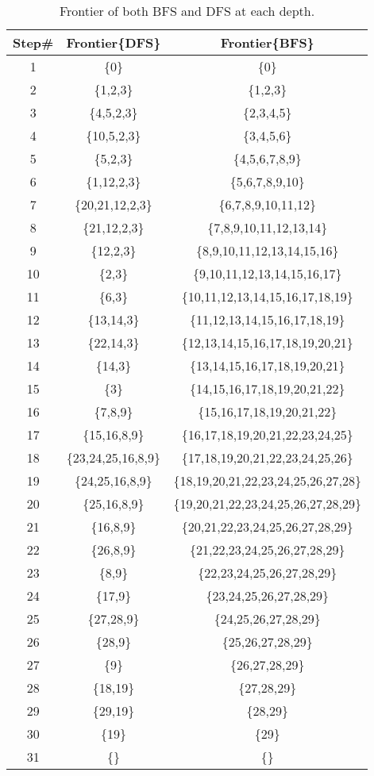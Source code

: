 \documentclass[11px]{article}
\begin{document}
\begin{table}[h]
\centering
\begin{adjustbox}{width=0.5\linewidth}
\begin{tabular}{c|c|c|}

  Step\#  & Frontier\{DFS\} & Frontier\{BFS\} \\ \hline
     1 & \{0\} & \{0\} \\
     2 & \{1,2,3\} & \{1,2,3\} \\
     3 & \{4,5,2,3\} & \{2,3,4,5\} \\
     4 & \{10,5,2,3\} & \{3,4,5,6\} \\
     5 & \{5,2,3\} & \{4,5,6,7,8,9\} \\
     6 & \{1,12,2,3\} & \{5,6,7,8,9,10\} \\
     7 & \{20,21,12,2,3\} & \{6,7,8,9,10,11,12\} \\
     8 & \{21,12,2,3\} & \{7,8,9,10,11,12,13,14\} \\
     9 & \{12,2,3\} & \{8,9,10,11,12,13,14,15,16\} \\
     10 & \{2,3\} & \{9,10,11,12,13,14,15,16,17\} \\
     11 & \{6,3\} & \{10,11,12,13,14,15,16,17,18,19\} \\
     12 & \{13,14,3\} & \{11,12,13,14,15,16,17,18,19\} \\
     13 & \{22,14,3\} & \{12,13,14,15,16,17,18,19,20,21\} \\
     14 & \{14,3\} & \{13,14,15,16,17,18,19,20,21\} \\
     15 & \{3\} & \{14,15,16,17,18,19,20,21,22\} \\
     16 & \{7,8,9\} & \{15,16,17,18,19,20,21,22\} \\
     17 & \{15,16,8,9\} & \{16,17,18,19,20,21,22,23,24,25\} \\
     18 & \{23,24,25,16,8,9\} & \{17,18,19,20,21,22,23,24,25,26\} \\
     19 & \{24,25,16,8,9\} & \{18,19,20,21,22,23,24,25,26,27,28\} \\
     20 & \{25,16,8,9\} & \{19,20,21,22,23,24,25,26,27,28,29\} \\
     21 & \{16,8,9\} & \{20,21,22,23,24,25,26,27,28,29\} \\
     22 & \{26,8,9\} & \{21,22,23,24,25,26,27,28,29\} \\
     23 & \{8,9\} & \{22,23,24,25,26,27,28,29\} \\
     24 & \{17,9\} & \{23,24,25,26,27,28,29\} \\
     25 & \{27,28,9\} & \{24,25,26,27,28,29\} \\
     26 & \{28,9\} & \{25,26,27,28,29\} \\
     27 & \{9\} & \{26,27,28,29\} \\
     28 & \{18,19\} & \{27,28,29\} \\
     29 & \{29,19\} & \{28,29\} \\
     30 & \{19\} & \{29\} \\
     31 & \{\} & \{\} \\
     
\end{tabular}
\end{adjustbox}
\caption{Frontier of both BFS and DFS at each depth.} 
\end{table}
\end{document}
